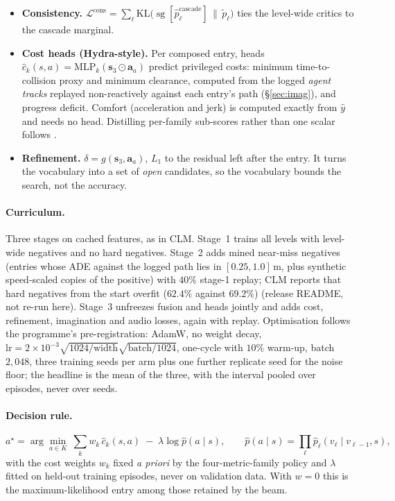 \begin{itemize}
\item \textbf{Consistency.} $\mathcal L^{\text{cons}}=\sum_\ell\mathrm{KL}\big(\operatorname{sg}[\hat p^{\text{cascade}}_\ell]\,\|\,\tilde p_\ell\big)$ ties the level-wide critics to the cascade marginal.
\item \textbf{Cost heads (Hydra-style).} Per composed entry, heads $\hat c_k(s,a)=\mathrm{MLP}_k(\mathbf s_3\odot\mathbf a_a)$ predict privileged costs: minimum time-to-collision proxy and minimum clearance, computed from the logged \emph{agent tracks} replayed non-reactively against each entry's path (\S\ref{sec:imag}), and progress deficit. Comfort (acceleration and jerk) is computed exactly from $\hat y$ and needs no head. Distilling per-family sub-scores rather than one scalar follows \citet{li2024hydramdp}.
\item \textbf{Refinement.} $\delta=g(\mathbf s_3,\mathbf a_a)$, $L_1$ to the residual left after the entry. It turns the vocabulary into a set of \emph{open} candidates, so the vocabulary bounds the search, not the accuracy.
\end{itemize}

\paragraph{Curriculum.} Three stages on cached features, as in CLM. Stage~1 trains all levels with level-wide negatives and no hard negatives. Stage~2 adds mined near-miss negatives (entries whose ADE against the logged path lies in $[0.25,1.0]$\,m, plus synthetic speed-scaled copies of the positive) with $40\%$ stage-1 replay; CLM reports that hard negatives from the start overfit
($62.4\%$ against $69.2\%$)\evP{} (release README, not re-run here). Stage~3 unfreezes fusion and heads jointly and adds cost, refinement, imagination and audio losses, again with replay. Optimisation follows the programme's pre-registration: AdamW, no weight decay,
$\text{lr}=2\!\times\!10^{-3}\sqrt{1024/\text{width}}\sqrt{\text{batch}/1024}$, one-cycle with $10\%$ warm-up, batch $2{,}048$, three training seeds per arm plus one further replicate seed for the noise floor; the headline is the mean of the three, with the interval pooled over episodes, never over seeds.

\paragraph{Decision rule.}
\begin{equation}
a^\star=\arg\min_{a\in K}\ \sum_{k}w_k\,\hat c_k(s,a)\;-\;\lambda\log\hat p(a\mid s),\qquad \hat p(a\mid s)=\prod_{\ell}\hat p_\ell(v_\ell\mid v_{\ell-1},s),
\end{equation}
with the cost weights $w_k$ fixed \emph{a priori} by the four-metric-family policy and $\lambda$ fitted on held-out training episodes, never on validation data. With $w=0$ this is the maximum-likelihood entry among those retained by the beam.


